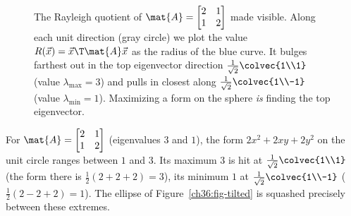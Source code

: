 \begin{figure}[H]
\centering
{}
\caption{The Rayleigh quotient of $\mat{A}=\protect\begin{bmatrix}2&1\\1&2\protect\end{bmatrix}$
made visible. Along each unit direction (gray circle) we plot the value
$R(\vec{x})=\vec{x}\T\mat{A}\vec{x}$ as the radius of the blue curve. It bulges
farthest out in the top eigenvector direction $\tfrac{1}{\sqrt2}\colvec{1\\1}$
(value $\lambda_{\max}=3$) and pulls in closest along $\tfrac{1}{\sqrt2}\colvec{1\\-1}$
(value $\lambda_{\min}=1$). Maximizing a form on the sphere \emph{is} finding the top
eigenvector.}
\label{ch36:fig-rayleigh}
\end{figure}

\begin{example}
\label{ch36:ex-rayleigh}
For $\mat{A}=\begin{bmatrix}2&1\\1&2\end{bmatrix}$ (eigenvalues $3$ and $1$), the form
$2x^2+2xy+2y^2$ on the unit circle ranges between $1$ and $3$. Its maximum $3$ is hit
at $\tfrac{1}{\sqrt2}\colvec{1\\1}$ (the form there is $\tfrac12(2+2+2)=3$), its
minimum $1$ at $\tfrac{1}{\sqrt2}\colvec{1\\-1}$ ($\tfrac12(2-2+2)=1$). The ellipse of
Figure~\ref{ch36:fig-tilted} is squashed precisely between these extremes.
\end{example}

